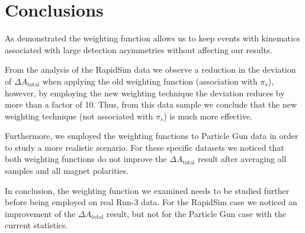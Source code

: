 \documentclass{article}
\begin{document}
        \section{Conclusions}
        As demonstrated the weighting function allows us to keep events with kinematics associated with large detection asymmetries without affecting our results.

        From the analysis of the RapidSim data we observe a reduction in the deviation of $\Delta A_\text{total}$ when applying the old weighting function (association with $\pi_s$), however, by employing the new weighting technique the deviation reduces by more than a factor of 10.
        Thus, from this data sample we conclude that the new weighting technique (not associated with $\pi_s$) is much more effective.

        Furthermore, we employed the weighting functions to Particle Gun data in order to study a more realistic scenario.
        For these specific datasets we noticed that both weighting functions do not improve the $\Delta A_\text{total}$ result after averaging all samples and all magnet polarities.
        

        In conclusion, the weighting function we examined needs to be studied further before being employed on real Run-3 data. 
        For the RapidSim case we noticed an improvement of the $\Delta A_\text{total}$ result, but not for the Particle Gun case with the current statistics.
        
        \pagebreak
        \nocite{*}
        \printbibliography[notcategory=cited]
\end{document}
